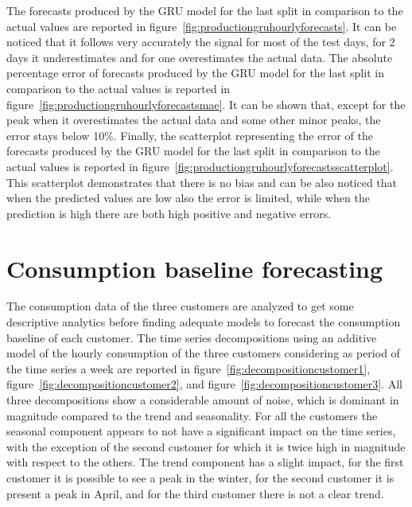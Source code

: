 The forecasts produced by the GRU model for the last split in comparison to the actual values are reported in figure~\ref{fig:productiongruhourlyforecasts}.
It can be noticed that it follows very accurately the signal for most of the test days, for 2 days it underestimates and for one overestimates the actual data.
The absolute percentage error of forecasts produced by the GRU model for the last split in comparison to the actual values is reported in figure~\ref{fig:productiongruhourlyforecastsmae}.
It can be shown that, except for the peak when it overestimates the actual data and some other minor peaks, the error stays below 10\%.
Finally, the scatterplot representing the error of the forecasts produced by the GRU model for the last split in comparison to the actual values is reported in figure~\ref{fig:productiongruhourlyforecastsscatterplot}.
This scatterplot demonstrates that there is no bias and can be also noticed that when the predicted values are low also the error is limited, while when the prediction is high there are both high positive and negative errors.



\section{Consumption baseline forecasting} 
\label{sec:baselineval}
\vspace{0.2 cm}

The consumption data of the three customers are analyzed to get some descriptive analytics before finding adequate models to forecast the consumption baseline of each customer.
The time series decompositions using an additive model of the hourly consumption of the three customers considering as period of the time series a week are reported in figure~\ref{fig:decompositioncustomer1}, figure~\ref{fig:decompositioncustomer2}, and figure~\ref{fig:decompositioncustomer3}.
All three decompositions show a considerable amount of noise, which is dominant in magnitude compared to the trend and seasonality.
For all the customers the seasonal component appears to not have a significant impact on the time series, with the exception of the second customer for which it is twice high in magnitude with respect to the others.
The trend component has a slight impact, for the first customer it is possible to see a peak in the winter, for the second customer it is present a peak in April, and for the third customer there is not a clear trend.

